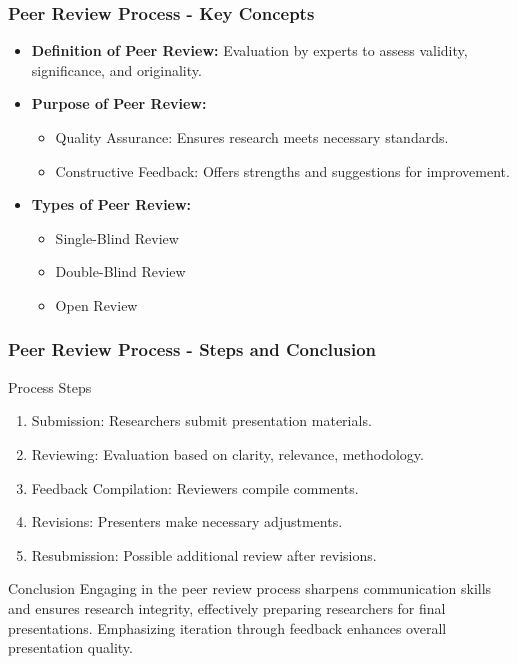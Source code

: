 \documentclass[aspectratio=169]{beamer}
\begin{document}
\begin{frame}[fragile]
    \frametitle{Peer Review Process - Key Concepts}
    \begin{itemize}
        \item \textbf{Definition of Peer Review:} Evaluation by experts to assess validity, significance, and originality.
        
        \item \textbf{Purpose of Peer Review:}
        \begin{itemize}
            \item Quality Assurance: Ensures research meets necessary standards.
            \item Constructive Feedback: Offers strengths and suggestions for improvement.
        \end{itemize}
        
        \item \textbf{Types of Peer Review:}
        \begin{itemize}
            \item Single-Blind Review
            \item Double-Blind Review
            \item Open Review
        \end{itemize}
    \end{itemize}
\end{frame}

\begin{frame}[fragile]
    \frametitle{Peer Review Process - Steps and Conclusion}
    \begin{block}{Process Steps}
        \begin{enumerate}
            \item Submission: Researchers submit presentation materials.
            \item Reviewing: Evaluation based on clarity, relevance, methodology.
            \item Feedback Compilation: Reviewers compile comments.
            \item Revisions: Presenters make necessary adjustments.
            \item Resubmission: Possible additional review after revisions.
        \end{enumerate}
    \end{block}
  
    \begin{block}{Conclusion}
        Engaging in the peer review process sharpens communication skills and ensures research integrity, effectively preparing researchers for final presentations. Emphasizing iteration through feedback enhances overall presentation quality.
    \end{block}
\end{frame}
\end{document}
